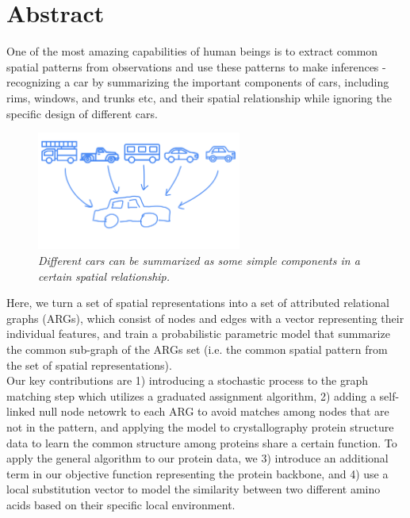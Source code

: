 \chapter*{Abstract}

One of the most amazing capabilities of human beings is to extract common spatial patterns from observations and use these patterns to make inferences - recognizing a car by summarizing the important components of cars, including rims, windows, and trunks etc, and their spatial relationship while ignoring the specific design of different cars. 

\begin{figure}[h]
	\centering
	\captionsetup{justification=centering}
	\includegraphics[width=0.6\textwidth]{figs/car_summary.png}
	\caption[Caption for LOF]{\emph{Different cars can be summarized as some simple components in a certain spatial relationship.\footnotemark}}
	\label{fig:car_summary}
\end{figure}

Here, we turn a set of spatial representations into a set of attributed relational graphs (ARGs), which consist of nodes and edges with a vector representing their individual features, and train a probabilistic parametric model that summarize the common sub-graph of the ARGs set (i.e. the common spatial pattern from the set of spatial representations).\\

Our key contributions are 1) introducing a stochastic process to the graph matching step which utilizes a graduated assignment algorithm, 2) adding a self-linked null node netowrk to each ARG to avoid matches among nodes that are not in the pattern, and applying the model to crystallography protein structure data to learn the common structure among proteins share a certain function. To apply the general algorithm to our protein data, we 3) introduce an additional term in our objective function representing the protein backbone, and 4) use a local substitution vector to model the similarity between two different amino acids based on their specific local environment.\\

